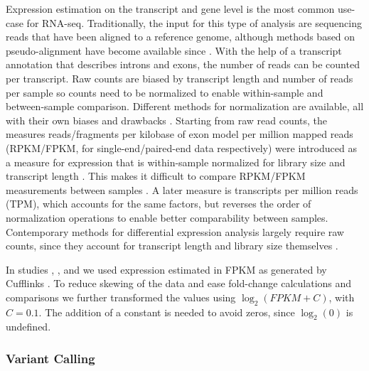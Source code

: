 \documentclass[11pt]{book}
\begin{document}
Expression estimation on the transcript and gene level is the most common use-case for RNA-seq. Traditionally, the input for this type of analysis are sequencing reads that have been aligned to a reference genome, although methods based on pseudo-alignment have become available since \cite{Bray:2016, Patro:2017}. With the help of a transcript annotation that describes introns and exons, the number of reads can be counted per transcript. Raw counts are biased by transcript length and number of reads per sample so counts need to be normalized to enable within-sample and between-sample comparison. Different methods for normalization are available, all with their own biases and drawbacks \cite{Dillies:2013, Conesa:2016, Li:2017, Evans:2018}. Starting from raw read counts, the measures reads/fragments per kilobase of exon model per million mapped reads (RPKM/FPKM, for single-end/paired-end data respectively) were introduced as a measure for expression that is within-sample normalized for library size and transcript length \cite{Mortazavi:2008}. This makes it difficult to compare RPKM/FPKM measurements between samples \cite{Wagner:2012}. A later measure is transcripts per million reads (TPM), which accounts for the same factors, but reverses the order of normalization operations to enable better comparability between samples. Contemporary methods for differential expression analysis largely require raw counts, since they account for transcript length and library size themselves \cite{Conesa:2016}.

In studies \I, \III, and \IV we used expression estimated in FPKM as generated by Cufflinks \cite{Trapnell:2010, Roberts:2011}. To reduce skewing of the data and ease fold-change calculations and comparisons we further transformed the values using $\log_2(FPKM+C)$, with $C=0.1$. The addition of a constant is needed to avoid zeros, since $\log_2(0)$ is undefined. 


\subsubsection*{Variant Calling}
\label{subsubsec:variant-detection}
\end{document}
